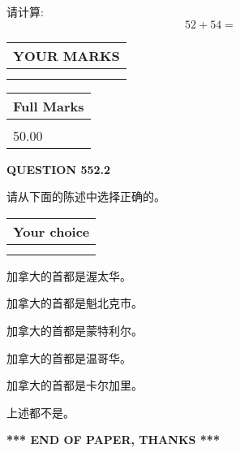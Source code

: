 \documentclass{ctexart}
\begin{document}
  
 
请计算:
\begin{equation}
52 +  %
54 = \nonumber
\end{equation}
 

 

 
  
\vspace{0.2in}
  
\noindent\begin{tabular}{|l|}
\hline
 YOUR MARKS  \\
\hline
 \\ 
 \\ 
\hline
\end{tabular}
\hspace{0.05in} \begin{tabular}{|l|}
\hline
 Full Marks  \\
\hline
 \\ 
50.00 \\
\hline
\end{tabular}
{\textbf{\Large{QUESTION
552.2 
}}}
  
  
请从下面的陈述中选择正确的。
  
  
\noindent\hspace{3.0in} \begin{tabular}{|l|}
\hline
Your choice \\
\hline
 \\ 
 \\ 
\hline
\end{tabular}
  
  
 
 
加拿大的首都是渥太华。
 
 
加拿大的首都是魁北克市。
 
 
加拿大的首都是蒙特利尔。
 
 
加拿大的首都是温哥华。
 
 
加拿大的首都是卡尔加里。
 
 
 上述都不是。
 
 
   
   
 \vspace{0.2in}
 
   
   
   
   
\vspace{1.0in} 
{\textbf{\large{ *** END OF PAPER, THANKS *** }}} 
   
\end{document}
